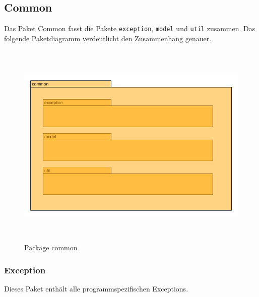 
\newpage
\subsection{Common}

Das Paket Common fasst die Pakete \texttt{exception}, \texttt{model} und \texttt{util} zusammen. Das folgende Paketdiagramm verdeutlicht den Zusammenhang genauer.

\begin{figure}[H]
	\centering
  \includegraphics[width=\textwidth,height=10cm,keepaspectratio]{../UMLDiagramme/common/gfx/4_package_common.png}
	\caption{Package common}
\end{figure}


\newpage
\subsubsection{Exception}

Dieses Paket enthält alle programmspezifischen Exceptions.

